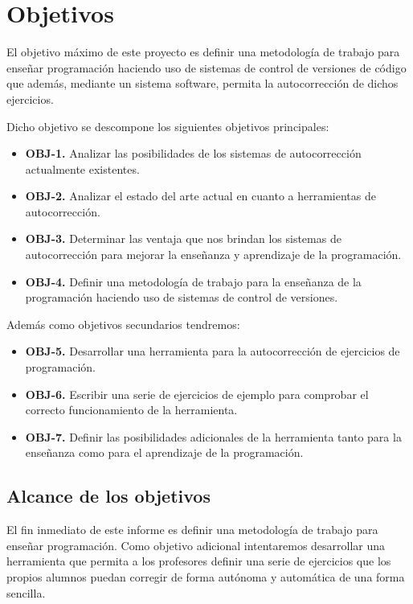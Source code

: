 \chapter{Objetivos}

El objetivo máximo de este proyecto es definir una metodología de trabajo para enseñar programación haciendo uso de sistemas de control de versiones de código que además, mediante un sistema software, permita la autocorrección de dichos ejercicios.

\bigskip
Dicho objetivo se descompone los siguientes objetivos principales:

\begin{itemize}
  \item \textbf{OBJ-1.} Analizar las posibilidades de los sistemas de autocorrección actualmente existentes.
  \item \textbf{OBJ-2.} Analizar el estado del arte actual en cuanto a herramientas de autocorrección.
  \item \textbf{OBJ-3.} Determinar las ventaja que nos brindan los sistemas de autocorrección para mejorar la enseñanza y aprendizaje de la programación.
  \item \textbf{OBJ-4.} Definir una metodología de trabajo para la enseñanza de la programación haciendo uso de sistemas de control de versiones.

\end{itemize}

Además como objetivos secundarios tendremos:

\begin{itemize}
  \item \textbf{OBJ-5.} Desarrollar una herramienta para la autocorrección de ejercicios de programación.
  \item \textbf{OBJ-6.} Escribir una serie de ejercicios de ejemplo para comprobar el correcto funcionamiento de la herramienta.
  \item \textbf{OBJ-7.} Definir las posibilidades adicionales de la herramienta tanto para la enseñanza como para el aprendizaje de la programación.
\end{itemize}

\section{Alcance de los objetivos}
El fin inmediato de este informe es definir una metodología de trabajo para enseñar programación. Como objetivo adicional intentaremos desarrollar una herramienta que permita a los profesores definir una serie de ejercicios que los propios alumnos puedan corregir de forma autónoma y automática de una forma sencilla.\\

